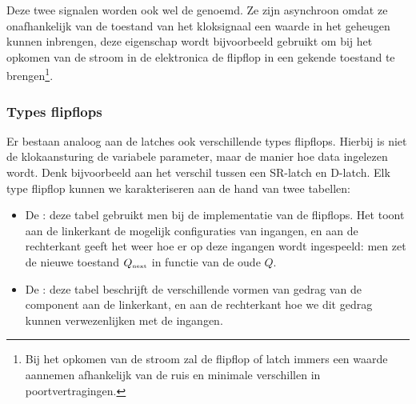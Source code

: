 Deze twee signalen worden ook wel de  genoemd. Ze zijn asynchroon omdat ze onafhankelijk van de toestand van het kloksignaal een waarde in het geheugen kunnen inbrengen, deze eigenschap wordt bijvoorbeeld gebruikt om bij het opkomen van de stroom in de elektronica de flipflop in een gekende toestand te brengen\footnote{Bij het opkomen van de stroom zal de flipflop of latch immers een waarde aannemen afhankelijk van de ruis en minimale verschillen in poortvertragingen.}.

\subsubsection{Types flipflops}
Er bestaan analoog aan de latches ook verschillende types flipflops. Hierbij is niet de klokaansturing de variabele parameter, maar de manier hoe data ingelezen wordt. Denk bijvoorbeeld aan het verschil tussen een SR-latch en D-latch. Elk type flipflop kunnen we karakteriseren aan de hand van twee tabellen:

\begin{itemize}
 \item De : deze tabel gebruikt men bij de implementatie van de flipflops. Het toont aan de linkerkant de mogelijk configuraties van ingangen, en aan de rechterkant geeft het weer hoe er op deze ingangen wordt ingespeeld: men zet de nieuwe toestand $Q_{\mbox{\tiny{next}}}{}$ in functie van de oude $Q$.
 \item De : deze tabel beschrijft de verschillende vormen van gedrag van de component aan de linkerkant, en aan de rechterkant hoe we dit gedrag kunnen verwezenlijken met de ingangen.
\end{itemize}

